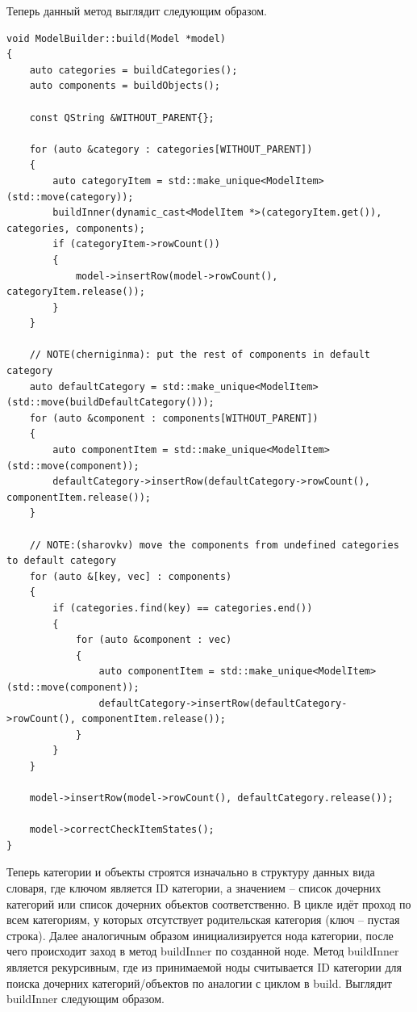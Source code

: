 \documentclass[bachelor, och, pract]{SCWorks}
\begin{document}
Теперь данный метод выглядит следующим образом.

\begin{verbatim}
void ModelBuilder::build(Model *model)
{
    auto categories = buildCategories();
    auto components = buildObjects();
    
    const QString &WITHOUT_PARENT{};

    for (auto &category : categories[WITHOUT_PARENT])
    {
        auto categoryItem = std::make_unique<ModelItem>(std::move(category));
        buildInner(dynamic_cast<ModelItem *>(categoryItem.get()), categories, components);
        if (categoryItem->rowCount())
        {
            model->insertRow(model->rowCount(), categoryItem.release());
        }
    }

    // NOTE(cherniginma): put the rest of components in default category
    auto defaultCategory = std::make_unique<ModelItem>(std::move(buildDefaultCategory()));
    for (auto &component : components[WITHOUT_PARENT])
    {
        auto componentItem = std::make_unique<ModelItem>(std::move(component));
        defaultCategory->insertRow(defaultCategory->rowCount(), componentItem.release());
    }

    // NOTE:(sharovkv) move the components from undefined categories to default category
    for (auto &[key, vec] : components)
    {
        if (categories.find(key) == categories.end())
        {
            for (auto &component : vec)
            {
                auto componentItem = std::make_unique<ModelItem>(std::move(component));
                defaultCategory->insertRow(defaultCategory->rowCount(), componentItem.release());
            }
        }
    }

    model->insertRow(model->rowCount(), defaultCategory.release());
    
    model->correctCheckItemStates();
}
\end{verbatim}

Теперь категории и объекты строятся изначально в структуру данных вида словаря, где ключом является ID категории, а значением -- список дочерних категорий или список дочерних объектов соответственно.
В цикле идёт проход по всем категориям, у которых отсутствует родительская категория (ключ -- пустая строка).
Далее аналогичным образом инициализируется нода категории, после чего происходит заход в метод buildInner по созданной ноде.
Метод buildInner является рекурсивным, где из принимаемой ноды считывается ID категории для поиска дочерних категорий/объектов по аналогии с циклом в build.
Выглядит buildInner следующим образом.
\end{document}
